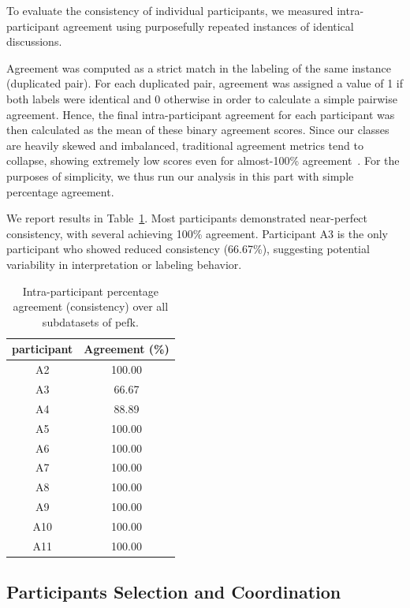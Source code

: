 \documentclass[11pt]{article}
\theoremstyle{definition}
\theoremstyle{plain}
\begin{document}
To evaluate the consistency of individual participants, we measured intra-participant agreement using purposefully repeated instances of identical discussions. 

Agreement was computed as a strict match in the labeling of the same instance (duplicated pair). For each duplicated pair, agreement was assigned a value of 1 if both labels were identical and 0 otherwise in order to calculate a simple pairwise agreement. Hence, the final intra-participant agreement for each participant was then calculated as the mean of these binary agreement scores. Since our classes are heavily skewed and imbalanced, traditional agreement metrics tend to collapse, showing extremely low scores even for almost-100\% agreement~\citep{rottger-etal-2022-two, Feinstein1990HighAgreement}. For the purposes of simplicity, we thus run our analysis in this part with simple percentage agreement.

We report results in Table~\ref{tab:intra_agreement}. Most participants demonstrated near-perfect consistency, with several achieving 100\% agreement. Participant A3 is the only participant who showed reduced consistency (66.67\%), suggesting potential variability in interpretation or labeling behavior.

\begin{table}[t]
	\centering
	\begin{tabular}{cc}
		\toprule
		\textbf{participant} & \textbf{Agreement (\%)} \\
		\toprule
		A2  & 100.00 \\
		A3  & 66.67 \\
		A4  & 88.89 \\
		A5  & 100.00 \\
		A6  & 100.00 \\
		A7  & 100.00 \\
		A8  & 100.00 \\
		A9  & 100.00 \\
		A10 & 100.00 \\
		A11 & 100.00 \\
		\bottomrule
	\end{tabular}
	\caption{Intra-participant percentage agreement (consistency) over all subdatasets of \ac{pefk}.}
	\label{tab:intra_agreement}
\end{table}


\subsection{Participants Selection and Coordination}
\label{app:participants_select}
\end{document}
